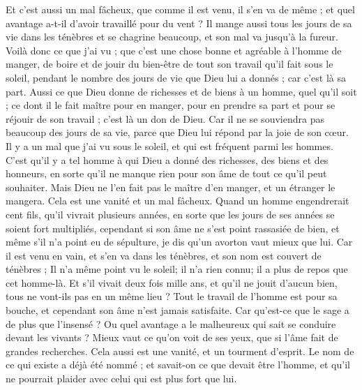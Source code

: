 \begin{multicols}{2}
Et c'est aussi un mal fâcheux, que comme il est venu, il s'en va de même ; et quel avantage a-t-il d'avoir travaillé pour du vent ?
Il mange aussi tous les jours de sa vie dans les ténèbres et se chagrine beaucoup, et son mal va jusqu'à la fureur.
Voilà donc ce que j'ai vu ; que c'est une chose bonne et agréable à l'homme de manger, de boire et de jouir du bien-être de tout son travail qu'il fait sous le soleil, pendant le nombre des jours de vie que Dieu lui a donnés ; car c'est là sa part.
Aussi ce que Dieu donne de richesses et de biens à un homme, quel qu'il soit ; ce dont il le fait maître pour en manger, pour en prendre sa part et pour se réjouir de son travail ; c'est là un don de Dieu. 
Car il ne se souviendra pas beaucoup des jours de sa vie, parce que Dieu lui répond par la joie de son cœur. 
\VerseOne{}Il y a un mal que j'ai vu sous le soleil, et qui est fréquent parmi les hommes.
C'est qu'il y a tel homme à qui Dieu a donné des richesses, des biens et des honneurs, en sorte qu'il ne manque rien pour son âme de tout ce qu'il peut souhaiter. Mais Dieu ne l'en fait pas le maître d'en manger, et un étranger le mangera. Cela est une vanité et un mal fâcheux. 
Quand un homme engendrerait cent fils, qu'il vivrait plusieurs années, en sorte que les jours de ses années se soient fort multipliés, cependant si son âme ne s'est point rassasiée de bien, et même s'il n'a point eu de sépulture, je dis qu'un avorton vaut mieux que lui.
Car il est venu en vain, et s'en va dans les ténèbres, et son nom est couvert de ténèbres ;
Il n'a même point vu le soleil; il n'a rien connu; il a plus de repos que cet homme-là.
Et s'il vivait deux fois mille ans, et qu'il ne jouit d'aucun bien, tous ne vont-ils pas en un même lieu ?
Tout le travail de l'homme est pour sa bouche, et cependant son âme n'est jamais satisfaite.
Car qu'est-ce que le sage a de plus que l'insensé ? Ou quel avantage a le malheureux qui sait se conduire devant les vivants ?
Mieux vaut ce qu'on voit de ses yeux, que si l'âme fait de grandes recherches. Cela aussi est une vanité, et un tourment d'esprit.
Le nom de ce qui existe a déjà été nommé ; et savait-on ce que devait être l'homme, et qu'il ne pourrait plaider avec celui qui est plus fort que lui. 

\end{multicols}
